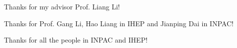\begin{thanks}

Thanks for my advisor Prof. Liang Li!

Thanks for Prof. Gang Li, Hao Liang in IHEP and Jianping Dai in INPAC!

Thanks for all the people in INPAC and IHEP!



\end{thanks}
